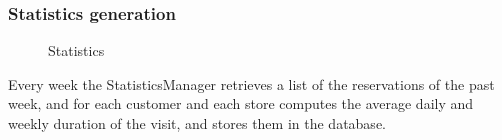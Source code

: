 \subsubsection{Statistics generation}
\begin{figure}[H]
	\noindent
	\caption{Statistics}
\end{figure}
Every week the StatisticsManager retrieves a list of the reservations of the past week, and for each customer and each store computes the average daily and weekly duration of the visit, and stores them in the database.
